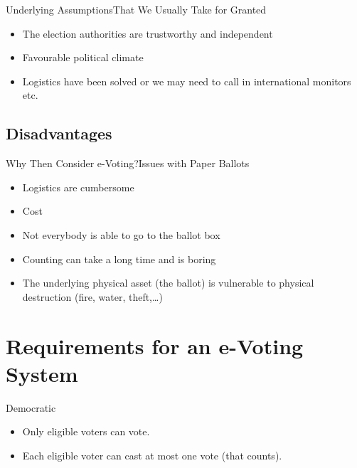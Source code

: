\documentclass[utf8]{beamer}
\begin{document}
\begin{frame}{Underlying Assumptions}{That We Usually Take for Granted}

  \begin{itemize}
  \item<1->The election authorities are trustworthy and independent
  \item<2->Favourable political climate
  \item<3->Logistics have been solved \pause or we may need to call in
    international monitors etc.
  \end{itemize}

\end{frame}

\subsection{Disadvantages}

\begin{frame}{Why Then Consider e-Voting?}{Issues with Paper Ballots}

  \begin{itemize}
  \item Logistics are cumbersome
  \item Cost
  \item Not everybody is able to go to the ballot box
  \item Counting can take a long time and is boring
  \item The underlying physical asset (the ballot) is vulnerable to
    physical destruction (fire, water, theft,\ldots)
  \end{itemize}

\end{frame}

\section{Requirements for an e-Voting System}

\begin{frame}{Democratic}

  \begin{itemize}
  \item Only eligible voters can vote.
  \item Each eligible voter can cast at most one vote (that counts).
  \end{itemize}

\end{frame}
\end{document}
